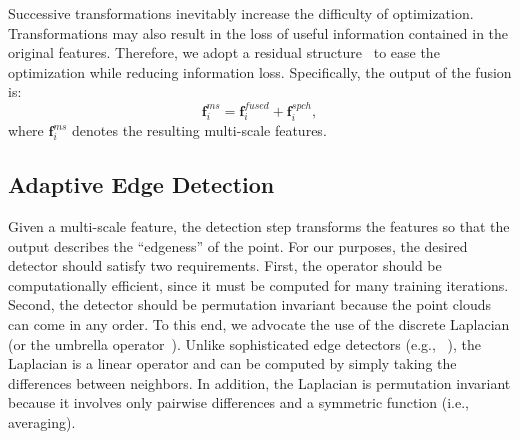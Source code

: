 \documentclass[sigconf]{acmart}
\begin{document}
Successive transformations inevitably increase the difficulty of optimization. Transformations may also result in the loss of useful information contained in the original features. 
Therefore, we adopt a residual structure~\cite{he2016deep} to ease the optimization while reducing information loss. 
Specifically, the output of the fusion is: 
\begin{equation}\label{eq: multi-scale fusion}
    \textbf{f}_i^{ms} = \textbf{f}^{fused}_i + \textbf{f}_i^{spch},
\end{equation}
where $\textbf{f}_i^{ms}$ denotes the resulting multi-scale features. 

\subsection{Adaptive Edge Detection}\label{sec: adaptive edge detection}



Given a multi-scale feature, the detection step transforms the features so that the output describes the ``edgeness'' of the point. For our purposes, the desired detector should satisfy two requirements. First, the operator should be computationally efficient, since it must be computed for many training iterations. Second, the detector should be permutation invariant because the point clouds can come in any order. 
To this end, we advocate the use of the discrete Laplacian (or the umbrella operator~\cite{taubin1995signal}).
Unlike sophisticated edge detectors (e.g., ~\cite{dollar2014fast}), the Laplacian is a linear operator and can be computed by simply taking the differences between neighbors. In addition, the Laplacian is permutation invariant because it involves only pairwise differences and a symmetric function (i.e., averaging).
\end{document}
